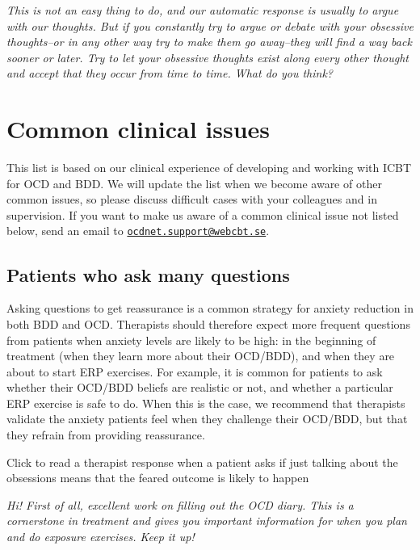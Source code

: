 \documentclass[]{book}
\theoremstyle{definition}
\theoremstyle{definition}
\theoremstyle{definition}
\theoremstyle{remark}
\begin{document}
\emph{This is not an easy thing to do, and our automatic response is
usually to argue with our thoughts. But if you constantly try to argue
or debate with your obsessive thoughts--or in any other way try to make
them go away--they will find a way back sooner or later. Try to let your
obsessive thoughts exist along every other thought and accept that they
occur from time to time. What do you think?}

\hypertarget{common-clinical-issues}{%
\section{Common clinical issues}\label{common-clinical-issues}}

This list is based on our clinical experience of developing and working
with ICBT for OCD and BDD. We will update the list when we become aware
of other common issues, so please discuss difficult cases with your
colleagues and in supervision. If you want to make us aware of a common
clinical issue not listed below, send an email to
\href{mailto:ocdnet.support@webcbt.se}{\nolinkurl{ocdnet.support@webcbt.se}}.

\hypertarget{patients-who-ask-many-questions}{%
\subsection{Patients who ask many
questions}\label{patients-who-ask-many-questions}}

Asking questions to get reassurance is a common strategy for anxiety
reduction in both BDD and OCD. Therapists should therefore expect more
frequent questions from patients when anxiety levels are likely to be
high: in the beginning of treatment (when they learn more about their
OCD/BDD), and when they are about to start ERP exercises. For example,
it is common for patients to ask whether their OCD/BDD beliefs are
realistic or not, and whether a particular ERP exercise is safe to do.
When this is the case, we recommend that therapists validate the anxiety
patients feel when they challenge their OCD/BDD, but that they refrain
from providing reassurance.

 Click to read a therapist response when a patient asks if just talking
about the obsessions means that the feared outcome is likely to happen

\emph{Hi! First of all, excellent work on filling out the OCD diary.
This is a cornerstone in treatment and gives you important information
for when you plan and do exposure exercises. Keep it up!}
\end{document}
